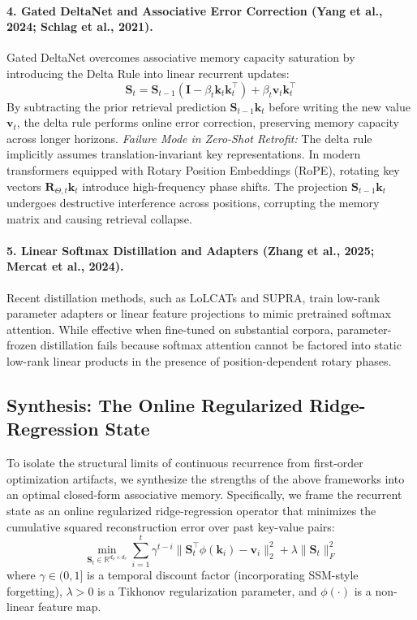 \documentclass[11pt,a4paper]{article}
\begin{document}
\paragraph{4. Gated DeltaNet and Associative Error Correction (Yang et al., 2024; Schlag et al., 2021).}
Gated DeltaNet overcomes associative memory capacity saturation by introducing the Delta Rule into linear recurrent updates:
\begin{equation}
\mathbf{S}_t = \mathbf{S}_{t-1}\left(\mathbf{I} - \beta_t \mathbf{k}_t \mathbf{k}_t^\top\right) + \beta_t \mathbf{v}_t \mathbf{k}_t^\top
\end{equation}
By subtracting the prior retrieval prediction $\mathbf{S}_{t-1}\mathbf{k}_t$ before writing the new value $\mathbf{v}_t$, the delta rule performs online error correction, preserving memory capacity across longer horizons.
\textit{Failure Mode in Zero-Shot Retrofit:} The delta rule implicitly assumes translation-invariant key representations. In modern transformers equipped with Rotary Position Embeddings (RoPE), rotating key vectors $\mathbf{R}_{\Theta, t}\mathbf{k}_t$ introduce high-frequency phase shifts. The projection $\mathbf{S}_{t-1}\mathbf{k}_t$ undergoes destructive interference across positions, corrupting the memory matrix and causing retrieval collapse.

\paragraph{5. Linear Softmax Distillation and Adapters (Zhang et al., 2025; Mercat et al., 2024).}
Recent distillation methods, such as LoLCATs and SUPRA, train low-rank parameter adapters or linear feature projections to mimic pretrained softmax attention. While effective when fine-tuned on substantial corpora, parameter-frozen distillation fails because softmax attention cannot be factored into static low-rank linear products in the presence of position-dependent rotary phases.

\subsection{Synthesis: The Online Regularized Ridge-Regression State}
\label{sec:ridge_synthesis}

To isolate the structural limits of continuous recurrence from first-order optimization artifacts, we synthesize the strengths of the above frameworks into an optimal closed-form associative memory. Specifically, we frame the recurrent state as an online regularized ridge-regression operator that minimizes the cumulative squared reconstruction error over past key-value pairs:
\begin{equation}
\label{eq:ridge_objective}
\min_{\mathbf{S}_t \in \mathbb{R}^{d_\phi \times d_v}} \sum_{i=1}^t \gamma^{t-i} \|\mathbf{S}_t^\top \phi(\mathbf{k}_i) - \mathbf{v}_i\|_2^2 + \lambda \|\mathbf{S}_t\|_F^2
\end{equation}
where $\gamma \in (0, 1]$ is a temporal discount factor (incorporating SSM-style forgetting), $\lambda > 0$ is a Tikhonov regularization parameter, and $\phi(\cdot)$ is a non-linear feature map.
\end{document}
